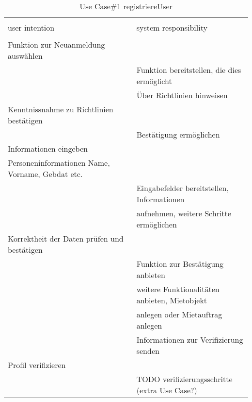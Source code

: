 \begin{table}[H]
\caption{Use Case\#1 registriereUser }
\centering
\begin{tabular}{l l}
\\ [-0.5ex]

\hline\hline
\\ [-0.5ex]
user intention & system responsibility
\\ [1.5ex]
\hline
\\ [-0.5ex]
Funktion zur Neuanmeldung auswählen 				& 												\\[1ex]
													& Funktion bereitstellen, die dies ermöglicht	\\[1ex]
													& Über Richtlinien hinweisen 					\\[1ex]
Kenntnissnahme zu Richtlinien bestätigen			& 												\\[1ex]
													& Bestätigung ermöglichen						\\[1ex]
Informationen eingeben 								& 												\\[1ex] 
Personeninformationen Name, Vorname, Gebdat etc. 	& 												\\[1ex] 
													& Eingabefelder bereitstellen, Informationen    \\[1ex]
													& aufnehmen, weitere Schritte ermöglichen		\\[1ex]
Korrektheit der Daten prüfen und bestätigen			& 												\\[1ex]
													& Funktion zur Bestätigung anbieten 			\\[1ex]
													& weitere Funktionalitäten anbieten, Mietobjekt \\[1ex]
													& anlegen oder Mietauftrag anlegen				\\[1ex]
													& Informationen zur Verifizierung senden		\\[1ex]
Profil verifizieren									& 												\\[1ex]
													& TODO verifizierungsschritte (extra Use Case?)	\\[1ex]


\hline
\end{tabular}
\label{tab:anmeldenUC}
\end{table}

